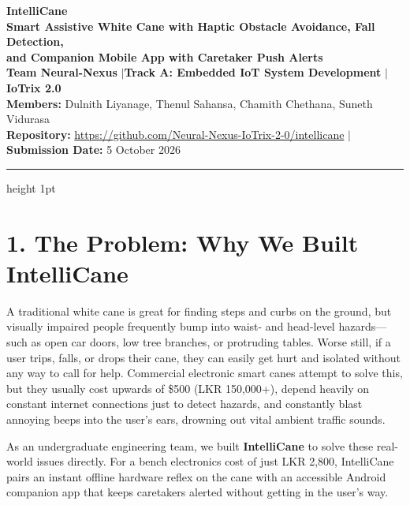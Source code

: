 \documentclass[10pt,a4paper]{article}
\begin{document}
\begin{center}
    {\LARGE \textbf{\color{primary} IntelliCane}} \\[0.3em]
    {\large \textbf{Smart Assistive White Cane with Haptic Obstacle Avoidance, Fall Detection, \\ and Companion Mobile App with Caretaker Push Alerts}} \\[0.5em]
    \small
    \textbf{Team Neural-Nexus} \quad$|$\quad \textbf{Track A: Embedded IoT System Development} \quad$|$\quad \textbf{IoTrix 2.0} \\
    \textbf{Members:} Dulnith Liyanage, Thenul Sahansa, Chamith Chethana, Suneth Vidurasa \\
    \textbf{Repository:} \url{https://github.com/Neural-Nexus-IoTrix-2-0/intellicane} \quad$|$\quad \textbf{Submission Date:} 5 October 2026
\end{center}
\vspace{-0.5em}
\hrule height 1pt
\vspace{0.5em}

\section{1. The Problem: Why We Built IntelliCane}
A traditional white cane is great for finding steps and curbs on the ground, but visually impaired people frequently bump into waist- and head-level hazards---such as open car doors, low tree branches, or protruding tables. Worse still, if a user trips, falls, or drops their cane, they can easily get hurt and isolated without any way to call for help. Commercial electronic smart canes attempt to solve this, but they usually cost upwards of \$500 (LKR 150,000+), depend heavily on constant internet connections just to detect hazards, and constantly blast annoying beeps into the user's ears, drowning out vital ambient traffic sounds.

As an undergraduate engineering team, we built \textbf{IntelliCane} to solve these real-world issues directly. For a bench electronics cost of just LKR 2,800, IntelliCane pairs an instant offline hardware reflex on the cane with an accessible Android companion app that keeps caretakers alerted without getting in the user's way.

\end{document}
